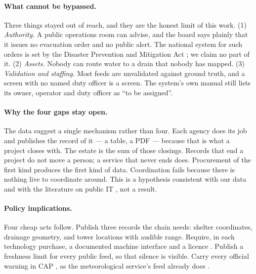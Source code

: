 \documentclass[10pt,twocolumn,a4paper]{article}
\begin{document}
\paragraph{What cannot be bypassed.} Three things stayed out of reach, and they are the honest limit of this work. (1) \emph{Authority.} A public operations room can advise, and the board says plainly that it issues no evacuation order and no public alert. The national system for such orders is set by the Disaster Prevention and Mitigation Act \citep{thailand2007dpmact}; we claim no part of it. (2) \emph{Assets.} Nobody can route water to a drain that nobody has mapped. (3) \emph{Validation and staffing.} Most feeds are unvalidated against ground truth, and a screen with no named duty officer is a screen. The system's own manual still lists its owner, operator and duty officer as ``to be assigned''.

\paragraph{Why the four gaps stay open.} The data suggest a single mechanism rather than four. Each agency does its job and publishes the record of it --- a table, a PDF --- because that is what a project closes with. The estate is the sum of those closings. Records that end a project do not move a person; a service that never ends does. Procurement of the first kind produces the first kind of data. Coordination fails because there is nothing live to coordinate around. This is a hypothesis consistent with our data and with the literature on public IT \citep{goldfinch2007,heeks2006,pahlka2023}, not a result.

\paragraph{Policy implications.} Four cheap acts follow. Publish three records the chain needs: shelter coordinates, drainage geometry, and tower locations with audible range. Require, in each technology purchase, a documented machine interface and a licence \citep{edler2007,mergel2019}. Publish a freshness limit for every public feed, so that silence is visible. Carry every official warning in CAP \citep{oasis2010cap}, as the meteorological service\textquoteright s feed already does \citep{tmd2026cap}.
\end{document}
